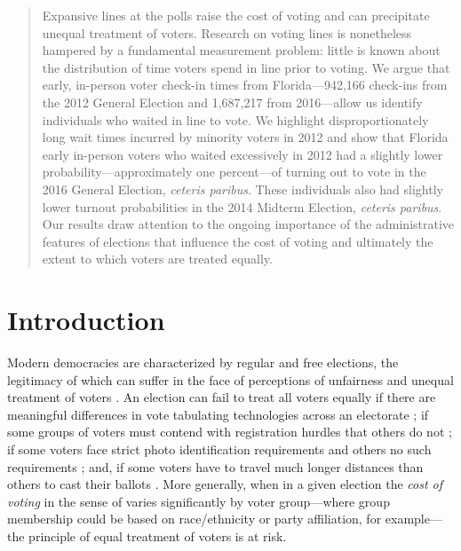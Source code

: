 \documentclass[12pt,titlepage]{article}
\begin{document}


\begin{abstract}
  \noindent 
  Expansive lines at the polls raise the cost of voting and can
  precipitate unequal treatment of voters. \mbox{Research} on voting lines is
  nonetheless hampered by a fundamental measurement problem: little is
  known about the distribution of time voters spend in line
  prior to voting. We
  argue that early, in-person voter check-in times from
  Florida---942,166
  check-ins from the 2012 General Election and 1,687,217 from
  2016---allow us identify individuals who waited in line to vote.  We
  highlight disproportionately long wait times incurred by minority
  voters in 2012 and show that Florida early in-person voters who
  waited excessively in 2012 had a slightly lower
  probability---approximately one percent---of turning out to vote in
  the 2016 General Election, \emph{ceteris paribus}.  These
  individuals also had slightly lower turnout probabilities in the
  2014 Midterm Election, \emph{ceteris paribus}.  Our results draw
  attention to the ongoing importance of the administrative features
  of elections that influence the cost of voting and ultimately the
  extent to which voters are treated equally.
\end{abstract}



\newpage
\section*{Introduction}

Modern democracies are characterized by regular and free elections,
the legitimacy of which can suffer in the face of perceptions of
unfairness and unequal treatment of voters
\citep{norris2014electoral}. An election can fail to treat all voters
equally if there are meaningful differences in vote tabulating
technologies across an electorate \citep{kimballkropf:tech}; if some
groups of voters must contend with registration hurdles that others do
not \citep{ansolhersh:registration}; if some voters face strict photo
identification requirements and others no such requirements
\citep{benteleetal:newjimcrow}; and, if some voters have to travel
much longer distances than others to cast their ballots
\citep{dyckgimpel:distance}. More generally, when in a given election
the \emph{cost of voting} in the sense of \cite{downs:econtheory}
varies significantly by voter group---where group membership could be
based on race/ethnicity or party affiliation, for example---the
principle of equal treatment of voters is at risk.
\end{document}
